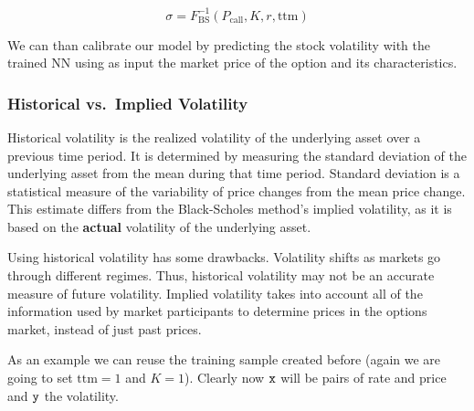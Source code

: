 \[ \sigma = F^{-1}_\textrm{BS}(P_\textrm{call}, K, r, \mathrm{ttm})\]

We can than calibrate our model by predicting the stock volatility with
the trained NN using as input the market price of the option and its
characteristics.

\subsubsection{Historical vs.~Implied
		Volatility}\label{historical-vs.-implied-volatility}

Historical volatility is the realized volatility of the underlying asset
over a previous time period. It is determined by measuring the standard
deviation of the underlying asset from the mean during that time period.
Standard deviation is a statistical measure of the variability of price
changes from the mean price change. This estimate differs from the
Black-Scholes method's implied volatility, as it is based on the
\textbf{actual} volatility of the underlying asset.

Using historical volatility has some drawbacks. Volatility shifts as
markets go through different regimes. Thus, historical volatility may
not be an accurate measure of future volatility. Implied volatility
takes into account all of the information used by market participants to
determine prices in the options market, instead of just past prices.

As an example we can reuse the training sample created before (again we
are going to set \(\mathrm{ttm}=1\) and \(K=1\)). Clearly now \(\tt{x}\)
will be pairs of rate and price and \(\tt{y}\) the volatility.

